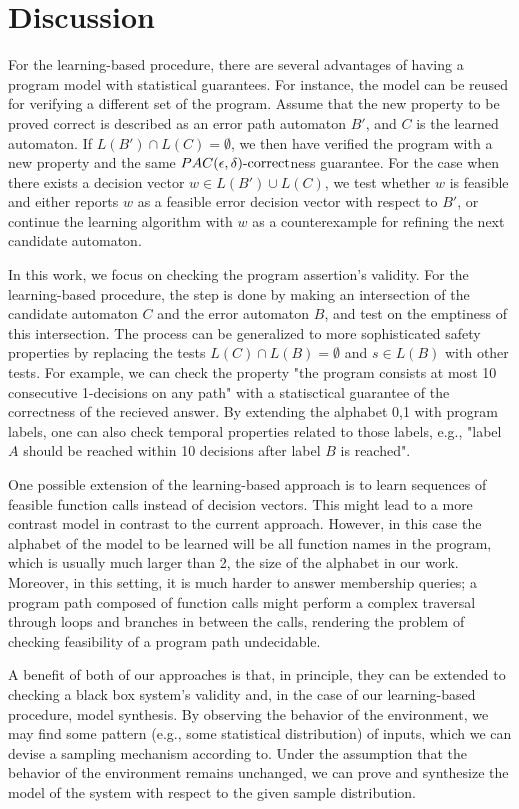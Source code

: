 \chapter{Discussion}\label{ch:discussion}

For the learning-based procedure, there are several advantages of having a program model with statistical guarantees. For instance, the model can be reused for verifying a different set of the program. Assume that the new property to be proved correct is described as an error path automaton $B'$, and $C$ is the learned automaton. If $L(B') \cap L(C) = \emptyset$, we then have verified the program with a new property and the same $PAC(\epsilon, \delta)\text{-correct}$ness guarantee. For the case when there exists a decision vector $w \in L(B') \cup L(C)$, we test whether $w$ is feasible and either reports $w$ as a feasible error decision vector with respect to $B'$, or continue the learning algorithm with $w$ as a counterexample for refining the next candidate automaton. 

In this work, we focus on checking the program assertion's validity. For the learning-based procedure, the step is done by making an intersection of the candidate automaton $C$ and the error automaton $B$, and test on the emptiness of this intersection. The process can be generalized to more sophisticated safety properties by replacing the tests $L(C) \cap L(B) = \emptyset$ and $s \in L(B)$ with other tests. For example, we can check the property "the program consists at most 10 consecutive 1-decisions on any path" with a statisctical guarantee of the correctness of the recieved answer. By extending the alphabet {0,1} with program labels, one can also check temporal properties related to those labels, e.g., "label $A$ should be reached within 10 decisions after label $B$ is reached". 

One possible extension of the learning-based approach is to learn sequences of feasible function calls instead of decision vectors. This might lead to a more contrast model in contrast to the current approach. However, in this case the alphabet of the model to be learned will be all function names in the program, which is usually much larger than 2, the size of the alphabet in our work. Moreover, in this setting, it is much harder to answer membership queries; a program path composed of function calls might perform a complex traversal through loops and branches in between the calls, rendering the problem of checking feasibility of a program path undecidable.

A benefit of both of our approaches is that, in principle, they can be extended to checking a black box system's validity and, in the case of our learning-based procedure, model synthesis. By observing the behavior of the environment, we may find some pattern (e.g., some statistical distribution) of inputs, which we can devise a sampling mechanism according to. Under the assumption that the behavior of the environment remains unchanged, we can prove and synthesize the model of the system with respect to the given sample distribution.